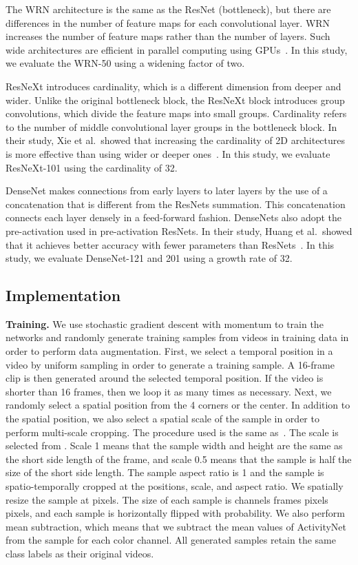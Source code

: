 \documentclass[10pt,twocolumn,letterpaper]{article}
\begin{document}
    The WRN architecture is the same as the ResNet (bottleneck),
    but there are differences in the number of feature maps for each convolutional layer.
    WRN increases the number of feature maps rather than the number of layers.
    Such wide architectures are efficient in parallel computing using GPUs~\cite{WideResNet}.
    In this study, we evaluate the WRN-50 using a widening factor of two.
    
    ResNeXt introduces cardinality, which is a different dimension from deeper and wider.
    Unlike the original bottleneck block, the ResNeXt block introduces group convolutions,
    which divide the feature maps into small groups.
    Cardinality refers to the number of middle convolutional layer groups in the bottleneck block.
    In their study, Xie et al.\ showed that
    increasing the cardinality of 2D architectures is more effective than using wider or deeper ones~\cite{resnext}.
    In this study, we evaluate ResNeXt-101 using the cardinality of 32.

    DenseNet makes connections from early layers to later layers by
    the use of a concatenation that is different from the ResNets summation.
    This concatenation connects each layer densely in a feed-forward fashion.
    DenseNets also adopt the pre-activation used in pre-activation ResNets.
    In their study, Huang et al.\ showed that it achieves better accuracy with fewer parameters than ResNets~\cite{densenets}.
    In this study, we evaluate DenseNet-121 and 201 using a growth rate of 32.

  \subsection{Implementation}
    \noindent \textbf{Training.}
      We use stochastic gradient descent with momentum to train the networks and
      randomly generate training samples from videos in training data in order to perform data augmentation.
      First, we select a temporal position in a video by uniform sampling in order to generate a training sample.
      A 16-frame clip is then generated around the selected temporal position.
      If the video is shorter than 16 frames, then we loop it as many times as necessary.
      Next, we randomly select a spatial position from the 4 corners or the center.
      In addition to the spatial position, we also select a spatial scale of the sample in order to perform multi-scale cropping.
      The procedure used is the same as~\cite{VeryDeepTwo}.
      The scale is selected from .
      Scale 1 means that the sample width and height are the same as the short side length of the frame,
      and scale 0.5 means that the sample is half the size of the short side length.
      The sample aspect ratio is 1 and the sample is spatio-temporally cropped at the positions, scale, and aspect ratio.
      We spatially resize the sample at  pixels.
      The size of each sample is
       channels  frames  pixels  pixels,
      and each sample is horizontally flipped with  probability.
      We also perform mean subtraction,
      which means that we subtract the mean values of ActivityNet from the sample for each color channel.
      All generated samples retain the same class labels as their original videos.
\end{document}
